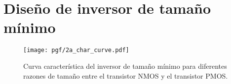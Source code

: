\section{Diseño de inversor de tamaño mínimo}

\begin{figure}[!h]
	\centering
	\texttt{[image: pgf/2a\_char\_curve.pdf]}
	\caption{Curva característica del inversor de tamaño mínimo para diferentes razones de tamaño entre el transistor NMOS y el transistor PMOS.}
\end{figure}